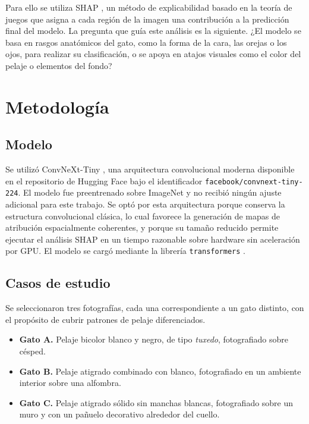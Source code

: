\documentclass[11pt]{article}
\begin{document}
Para ello se utiliza SHAP \citep{lundberg2017unified}, un método de explicabilidad basado en la teoría de juegos que asigna a cada región de la imagen una contribución a la predicción final del modelo. La pregunta que guía este análisis es la siguiente. ¿El modelo se basa en rasgos anatómicos del gato, como la forma de la cara, las orejas o los ojos, para realizar su clasificación, o se apoya en atajos visuales como el color del pelaje o elementos del fondo?

\section{Metodología}

\subsection{Modelo}

Se utilizó ConvNeXt-Tiny \citep{liu2022convnet}, una arquitectura convolucional moderna disponible en el repositorio de Hugging Face bajo el identificador \texttt{facebook/convnext-tiny-224}. El modelo fue preentrenado sobre ImageNet \citep{deng2009imagenet} y no recibió ningún ajuste adicional para este trabajo. Se optó por esta arquitectura porque conserva la estructura convolucional clásica, lo cual favorece la generación de mapas de atribución espacialmente coherentes, y porque su tamaño reducido permite ejecutar el análisis SHAP en un tiempo razonable sobre hardware sin aceleración por GPU. El modelo se cargó mediante la librería \texttt{transformers} \citep{wolf2020transformers}.

\subsection{Casos de estudio}

Se seleccionaron tres fotografías, cada una correspondiente a un gato distinto, con el propósito de cubrir patrones de pelaje diferenciados.

\begin{itemize}
  \item \textbf{Gato A.} Pelaje bicolor blanco y negro, de tipo \emph{tuxedo}, fotografiado sobre césped.
  \item \textbf{Gato B.} Pelaje atigrado combinado con blanco, fotografiado en un ambiente interior sobre una alfombra.
  \item \textbf{Gato C.} Pelaje atigrado sólido sin manchas blancas, fotografiado sobre un muro y con un pañuelo decorativo alrededor del cuello.
\end{itemize}
\end{document}
